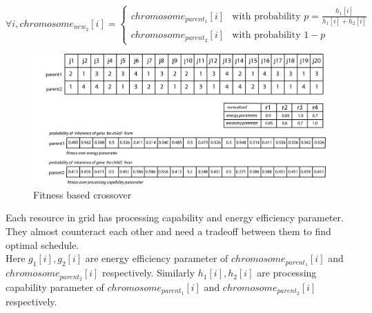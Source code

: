 $$
\forall i, chromosome_{new_2}[i] = \left\{ \begin{array}{rl}
 chromosome_{parent_1}[i] &\mbox{with probability $p = \frac{h_1[i]}{h_1[i] +h_2[i]}$} \\
 chromosome_{parent_2}[i] &\mbox{with probability $1-p$}
       \end{array} \right.
$$
\begin{figure}[t]
    \centering
    \includegraphics[width=1.0\columnwidth]{crossover5}
    \caption{Fitness based crossover}
	\label{fitcrossover}
\end{figure}
Each resource in grid has processing capability and energy efficiency parameter. They almost counteract each other and need a tradeoff between them to find optimal schedule.\\
Here  $g_1[i], g_2[i]$ are energy efficiency parameter of $chromosome_{parent_1}[i]$ and $chromosome_{parent_2}[i]$ respectively.
Similarly $h_1[i], h_2[i]$ are processing capability parameter of $chromosome_{parent_1}[i]$ and $chromosome_{parent_2}[i]$ respectively.
